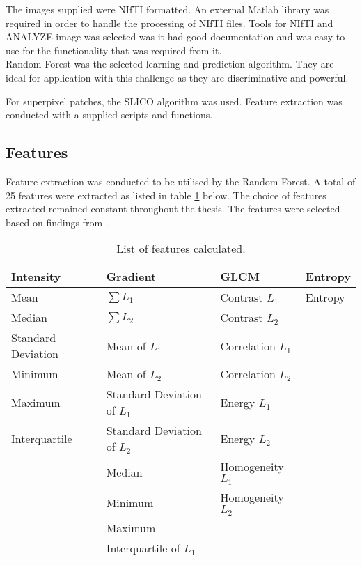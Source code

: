The images supplied were NIfTI formatted. An external Matlab library was required in order to handle the processing of NIfTI files. Tools for NIfTI and  ANALYZE image was selected was it had good documentation and was easy to use for the functionality that was required from it.
\\[1\baselineskip]
Random Forest was the selected learning and prediction algorithm. They are ideal for application with this challenge as they are discriminative and powerful. 

For superpixel patches, the SLICO algorithm was used. 
Feature extraction was conducted with a supplied scripts and functions.



\subsection{Features}
\label{sect:features}
Feature extraction was conducted to be utilised by the Random Forest. A total of 25 features were extracted as listed in table \ref{table: feature} below. The choice of features extracted remained constant throughout the thesis. The features were selected based on findings from . 

\begin{table}[H]
\centering
\caption{List of features calculated.}

\begin{tabular}{|l|l|l|l|}
\hline
\textbf{Intensity} & \textbf{Gradient} & \textbf{GLCM} & \textbf{Entropy}\\
\hline
Mean					 &	$\sum L_1$ 					&	Contrast $L_1$		&	Entropy\\
Median				 &	$\sum L_2$					&	Contrast $L_2$		&\\
Standard Deviation	 &  Mean of $L_1$				&	Correlation $L_1$	&\\
Minimum 				 &	Mean of $L_2$				& 	Correlation $L_2$	&\\
Maximum 				 &  	Standard Deviation of $L_1$ 	&	Energy $L_1$		 	&\\ 
Interquartile		 &  Standard Deviation of $L_2$	&	Energy $L_2$			&\\
				     &  Median 						& 	Homogeneity $L_1$	&\\
				   	 &  Minimum						& 	Homogeneity $L_2$	&\\
				    	 & 	Maximum 						& 						&\\ 
				    	 &	Interquartile of $L_1$		&						&\\
\hline				    	 			   			    	 
\end{tabular}
\label{table: feature}

\end{table}